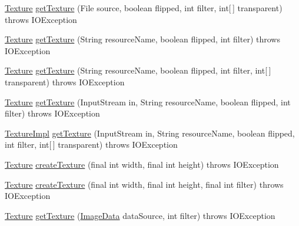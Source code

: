 \begin{DoxyCompactItemize}
\mbox{\hyperlink{interfaceorg_1_1newdawn_1_1slick_1_1opengl_1_1_texture}{Texture}} \mbox{\hyperlink{classorg_1_1newdawn_1_1slick_1_1opengl_1_1_internal_texture_loader_a87771fd138461a60d3ba7763a8712446}{get\+Texture}} (File source, boolean flipped, int filter, int\mbox{[}$\,$\mbox{]} transparent)  throws I\+O\+Exception 
\item 
\mbox{\hyperlink{interfaceorg_1_1newdawn_1_1slick_1_1opengl_1_1_texture}{Texture}} \mbox{\hyperlink{classorg_1_1newdawn_1_1slick_1_1opengl_1_1_internal_texture_loader_a1f123ec5aa1db858970982d6f7b2cc0c}{get\+Texture}} (String resource\+Name, boolean flipped, int filter)  throws I\+O\+Exception 
\item 
\mbox{\hyperlink{interfaceorg_1_1newdawn_1_1slick_1_1opengl_1_1_texture}{Texture}} \mbox{\hyperlink{classorg_1_1newdawn_1_1slick_1_1opengl_1_1_internal_texture_loader_a690450dca2c9fe7c2e0036a33ca79349}{get\+Texture}} (String resource\+Name, boolean flipped, int filter, int\mbox{[}$\,$\mbox{]} transparent)  throws I\+O\+Exception 
\item 
\mbox{\hyperlink{interfaceorg_1_1newdawn_1_1slick_1_1opengl_1_1_texture}{Texture}} \mbox{\hyperlink{classorg_1_1newdawn_1_1slick_1_1opengl_1_1_internal_texture_loader_a315d8e0c0dc76258342dd7e903bfa1af}{get\+Texture}} (Input\+Stream in, String resource\+Name, boolean flipped, int filter)  throws I\+O\+Exception 
\item 
\mbox{\hyperlink{classorg_1_1newdawn_1_1slick_1_1opengl_1_1_texture_impl}{Texture\+Impl}} \mbox{\hyperlink{classorg_1_1newdawn_1_1slick_1_1opengl_1_1_internal_texture_loader_aab0726a2bebb2b26791977daa6c53a2b}{get\+Texture}} (Input\+Stream in, String resource\+Name, boolean flipped, int filter, int\mbox{[}$\,$\mbox{]} transparent)  throws I\+O\+Exception 
\item 
\mbox{\hyperlink{interfaceorg_1_1newdawn_1_1slick_1_1opengl_1_1_texture}{Texture}} \mbox{\hyperlink{classorg_1_1newdawn_1_1slick_1_1opengl_1_1_internal_texture_loader_a153ef66a72ef567377e97b6e9604f7a1}{create\+Texture}} (final int width, final int height)  throws I\+O\+Exception 
\item 
\mbox{\hyperlink{interfaceorg_1_1newdawn_1_1slick_1_1opengl_1_1_texture}{Texture}} \mbox{\hyperlink{classorg_1_1newdawn_1_1slick_1_1opengl_1_1_internal_texture_loader_ad8179a3093383267b4474ff018efed90}{create\+Texture}} (final int width, final int height, final int filter)  throws I\+O\+Exception 
\item 
\mbox{\hyperlink{interfaceorg_1_1newdawn_1_1slick_1_1opengl_1_1_texture}{Texture}} \mbox{\hyperlink{classorg_1_1newdawn_1_1slick_1_1opengl_1_1_internal_texture_loader_a50b4b6c9e8fc9590ee17ea1eff33ecbb}{get\+Texture}} (\mbox{\hyperlink{interfaceorg_1_1newdawn_1_1slick_1_1opengl_1_1_image_data}{Image\+Data}} data\+Source, int filter)  throws I\+O\+Exception     

\end{DoxyCompactItemize}
